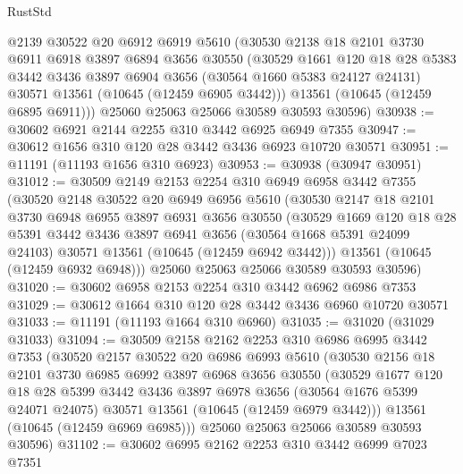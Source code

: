 \begin{lexlean}{RustStd}
\begin{coremodule}
      @2139
      @30522
      @20
      @6912
      @6919
      @5610
      (@30530
        @2138
        @18
        @2101
        @3730
        @6911
        @6918
        @3897
        @6894
        @3656
        @30550
        (@30529
          @1661
          @120
          @18
          @28
          @5383
          @3442
          @3436
          @3897
          @6904
          @3656
          (@30564 @1660 @5383 @24127 @24131)
          @30571
          @13561
          (@10645 (@12459 @6905 @3442)))
        @13561
        (@10645 (@12459 @6895 @6911)))
      @25060
      @25063
      @25066
      @30589
      @30593
      @30596)
@30938 := @30602 @6921 @2144 @2255 @310 @3442 @6925 @6949 @7355
@30947 := @30612 @1656 @310 @120 @28 @3442 @3436 @6923 @10720 @30571
@30951 := @11191 (@11193 @1656 @310 @6923)
@30953 := @30938 (@30947 @30951)
@31012 := @30509
    @2149
    @2153
    @2254
    @310
    @6949
    @6958
    @3442
    @7355
    (@30520
      @2148
      @30522
      @20
      @6949
      @6956
      @5610
      (@30530
        @2147
        @18
        @2101
        @3730
        @6948
        @6955
        @3897
        @6931
        @3656
        @30550
        (@30529
          @1669
          @120
          @18
          @28
          @5391
          @3442
          @3436
          @3897
          @6941
          @3656
          (@30564 @1668 @5391 @24099 @24103)
          @30571
          @13561
          (@10645 (@12459 @6942 @3442)))
        @13561
        (@10645 (@12459 @6932 @6948)))
      @25060
      @25063
      @25066
      @30589
      @30593
      @30596)
@31020 := @30602 @6958 @2153 @2254 @310 @3442 @6962 @6986 @7353
@31029 := @30612 @1664 @310 @120 @28 @3442 @3436 @6960 @10720 @30571
@31033 := @11191 (@11193 @1664 @310 @6960)
@31035 := @31020 (@31029 @31033)
@31094 := @30509
    @2158
    @2162
    @2253
    @310
    @6986
    @6995
    @3442
    @7353
    (@30520
      @2157
      @30522
      @20
      @6986
      @6993
      @5610
      (@30530
        @2156
        @18
        @2101
        @3730
        @6985
        @6992
        @3897
        @6968
        @3656
        @30550
        (@30529
          @1677
          @120
          @18
          @28
          @5399
          @3442
          @3436
          @3897
          @6978
          @3656
          (@30564 @1676 @5399 @24071 @24075)
          @30571
          @13561
          (@10645 (@12459 @6979 @3442)))
        @13561
        (@10645 (@12459 @6969 @6985)))
      @25060
      @25063
      @25066
      @30589
      @30593
      @30596)
@31102 := @30602 @6995 @2162 @2253 @310 @3442 @6999 @7023 @7351

\end{coremodule}
\end{lexlean}
